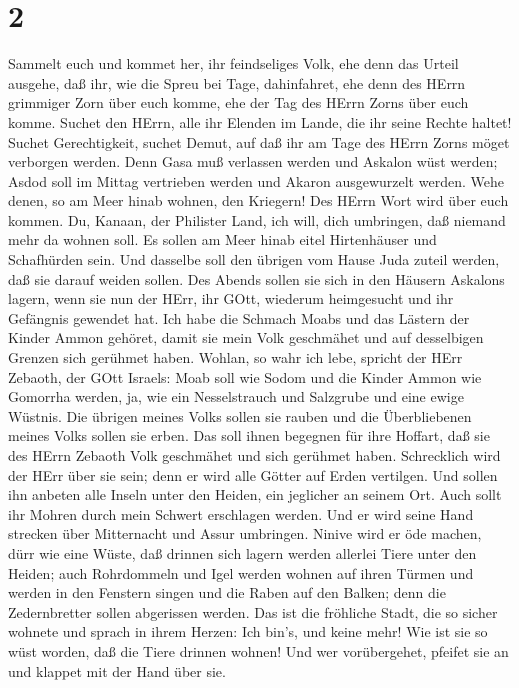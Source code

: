 \hypertarget{section-1}{%
\section{2}\label{section-1}}

 Sammelt euch und kommet her, ihr feindseliges Volk,
 ehe denn das Urteil ausgehe, daß ihr, wie die Spreu bei
Tage, dahinfahret, ehe denn des HErrn grimmiger Zorn über euch komme,
ehe der Tag des HErrn Zorns über euch komme.  Suchet den
HErrn, alle ihr Elenden im Lande, die ihr seine Rechte haltet! Suchet
Gerechtigkeit, suchet Demut, auf daß ihr am Tage des HErrn Zorns möget
verborgen werden.  Denn Gasa muß verlassen werden und
Askalon wüst werden; Asdod soll im Mittag vertrieben werden und Akaron
ausgewurzelt werden.  Wehe denen, so am Meer hinab wohnen,
den Kriegern! Des HErrn Wort wird über euch kommen. Du, Kanaan, der
Philister Land, ich will, dich umbringen, daß niemand mehr da wohnen
soll.  Es sollen am Meer hinab eitel Hirtenhäuser und
Schafhürden sein.  Und dasselbe soll den übrigen vom Hause
Juda zuteil werden, daß sie darauf weiden sollen. Des Abends sollen sie
sich in den Häusern Askalons lagern, wenn sie nun der HErr, ihr GOtt,
wiederum heimgesucht und ihr Gefängnis gewendet hat.  Ich
habe die Schmach Moabs und das Lästern der Kinder Ammon gehöret, damit
sie mein Volk geschmähet und auf desselbigen Grenzen sich gerühmet
haben.  Wohlan, so wahr ich lebe, spricht der HErr Zebaoth,
der GOtt Israels: Moab soll wie Sodom und die Kinder Ammon wie Gomorrha
werden, ja, wie ein Nesselstrauch und Salzgrube und eine ewige Wüstnis.
Die übrigen meines Volks sollen sie rauben und die Überbliebenen meines
Volks sollen sie erben.  Das soll ihnen begegnen für ihre
Hoffart, daß sie des HErrn Zebaoth Volk geschmähet und sich gerühmet
haben.  Schrecklich wird der HErr über sie sein; denn er
wird alle Götter auf Erden vertilgen. Und sollen ihn anbeten alle Inseln
unter den Heiden, ein jeglicher an seinem Ort.  Auch sollt
ihr Mohren durch mein Schwert erschlagen werden.  Und er
wird seine Hand strecken über Mitternacht und Assur umbringen. Ninive
wird er öde machen, dürr wie eine Wüste,  daß drinnen sich
lagern werden allerlei Tiere unter den Heiden; auch Rohrdommeln und Igel
werden wohnen auf ihren Türmen und werden in den Fenstern singen und die
Raben auf den Balken; denn die Zedernbretter sollen abgerissen werden.
 Das ist die fröhliche Stadt, die so sicher wohnete und
sprach in ihrem Herzen: Ich bin's, und keine mehr! Wie ist sie so wüst
worden, daß die Tiere drinnen wohnen! Und wer vorübergehet, pfeifet sie
an und klappet mit der Hand über sie.

